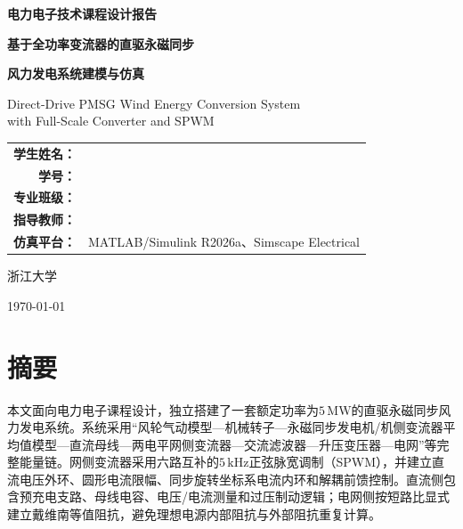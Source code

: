 \documentclass[UTF8,zihao=-4,fontset=fandol]{ctexrep}
\begin{document}
\begin{titlepage}
  \centering
  \vspace*{1.8cm}
  {\bfseries 电力电子技术课程设计报告\par}
  \vspace{1.5cm}
  {\bfseries 基于全功率变流器的直驱永磁同步\par}
  \vspace{0.3cm}
  {\bfseries 风力发电系统建模与仿真\par}
  \vspace{0.9cm}
  {Direct-Drive PMSG Wind Energy Conversion System\\
  with Full-Scale Converter and SPWM\par}
  \vfill
  \renewcommand{\arraystretch}{1.8}
  \begin{tabular}{>{\bfseries}r l}
    学生姓名： & \underline{\hspace{7cm}} \\
    学号： & \underline{\hspace{7cm}} \\
    专业班级： & \underline{\hspace{7cm}} \\
    指导教师： & \underline{\hspace{7cm}} \\
    仿真平台： & MATLAB/Simulink R2026a、Simscape Electrical \\
  \end{tabular}
  \vfill
  {浙江大学\par}
  \vspace{0.4cm}
  {\today\par}
\end{titlepage}

\chapter*{摘\quad 要}
本文面向电力电子课程设计，独立搭建了一套额定功率为\(5\,\mathrm{MW}\)的直驱永磁同步风力发电系统。系统采用“风轮气动模型---机械转子---永磁同步发电机/机侧变流器平均值模型---直流母线---两电平网侧变流器---交流滤波器---升压变压器---电网”等完整能量链。网侧变流器采用六路互补的\(5\,\mathrm{kHz}\)正弦脉宽调制（SPWM），并建立直流电压外环、圆形电流限幅、同步旋转坐标系电流内环和解耦前馈控制。直流侧包含预充电支路、母线电容、电压/电流测量和过压制动逻辑；电网侧按短路比显式建立戴维南等值阻抗，避免理想电源内部阻抗与外部阻抗重复计算。
\end{document}

